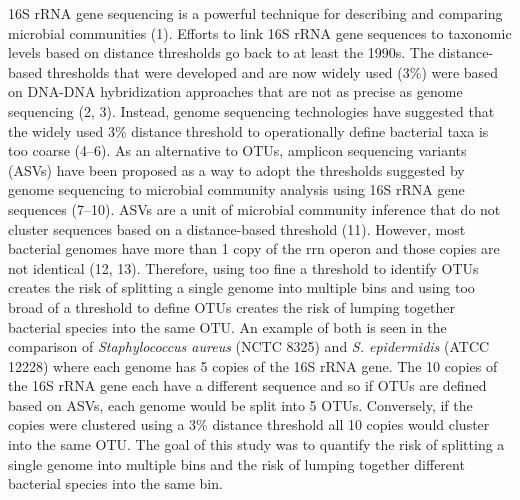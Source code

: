 \documentclass[
]{article}
\begin{document}
\newpage

16S rRNA gene sequencing is a powerful technique for describing and
comparing microbial communities (1). Efforts to link 16S rRNA gene
sequences to taxonomic levels based on distance thresholds go back to at
least the 1990s. The distance-based thresholds that were developed and
are now widely used (3\%) were based on DNA-DNA hybridization approaches
that are not as precise as genome sequencing (2, 3). Instead, genome
sequencing technologies have suggested that the widely used 3\% distance
threshold to operationally define bacterial taxa is too coarse (4--6).
As an alternative to OTUs, amplicon sequencing variants (ASVs) have been
proposed as a way to adopt the thresholds suggested by genome sequencing
to microbial community analysis using 16S rRNA gene sequences (7--10).
ASVs are a unit of microbial community inference that do not cluster
sequences based on a distance-based threshold (11). However, most
bacterial genomes have more than 1 copy of the rrn operon and those
copies are not identical (12, 13). Therefore, using too fine a threshold
to identify OTUs creates the risk of splitting a single genome into
multiple bins and using too broad of a threshold to define OTUs creates
the risk of lumping together bacterial species into the same OTU. An
example of both is seen in the comparison of \emph{Staphylococcus
aureus} (NCTC 8325) and \emph{S. epidermidis} (ATCC 12228) where each
genome has 5 copies of the 16S rRNA gene. The 10 copies of the 16S rRNA
gene each have a different sequence and so if OTUs are defined based on
ASVs, each genome would be split into 5 OTUs. Conversely, if the copies
were clustered using a 3\% distance threshold all 10 copies would
cluster into the same OTU. The goal of this study was to quantify the
risk of splitting a single genome into multiple bins and the risk of
lumping together different bacterial species into the same bin.
\end{document}
